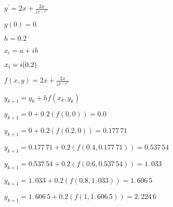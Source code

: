 \documentclass{article}
\begin{document}
\bigskip $y^{\prime }=2x+\frac{2x}{e^{y-x^{1}}}$

$y(0)=0$

$h=0.2$

$x_{i}=a+ih$

$\bigskip x_{i}=i(0.2)$

$f(x,y)=2x+\frac{2x}{e^{y-x^{1}}}$

$y_{k+1}=y_{k}+hf(x_{k},y_{k})$

$y_{k+1}=0+0.2(f(0,0))\allowbreak =\allowbreak 0.0$

$y_{k+1}=0+0.2(f(0.2,0))=\allowbreak 0.177\,71$

$y_{k+1}=0.177\,71+0.2(f(0.4,\allowbreak 0.177\,71))=\allowbreak 0.537\,54$

$y_{k+1}=\allowbreak \allowbreak 0.537\,54+0.2(f(0.6,\allowbreak \allowbreak
\allowbreak 0.537\,54))=\allowbreak 1.\,\allowbreak 033$

$y_{k+1}=\allowbreak 1.\,\allowbreak 033+0.2(f(0.8,\allowbreak
1.\,\allowbreak 033))=\allowbreak 1.\,\allowbreak 606\,5$

$y_{k+1}=\allowbreak \allowbreak 1.\,\allowbreak 606\,5+0.2(f(1,\allowbreak
\allowbreak \allowbreak 1.\,\allowbreak 606\,5))=\allowbreak 2.\,\allowbreak
224\,6$
\end{document}
